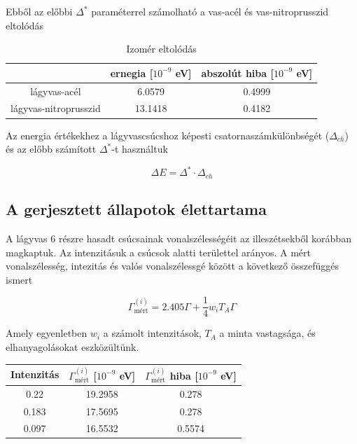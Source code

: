 \documentclass[a4paper,12pt]{article}
\begin{document}
\pagebreak

\par Ebből az előbbi $\Delta^{*}$ paraméterrel számolható a vas-acél és vas-nitroprusszid eltolódás

\begin{table}[!htb]
\begin{center}
\begin{tabular}{|c|c|c|}
\hline
 & ernegia [$10^{-9}$ eV] & abszolút hiba [$10^{-9}$ eV] \\
\hline
lágyvas-acél & 6.0579 & 0.4999 \\
\hline
lágyvas-nitroprusszid & 13.1418 & 0.4182 \\
\hline
\end{tabular}
\end{center}
\caption{Izomér eltolódás}
\end{table}

\par Az energia értékekhez a lágyvascsúcshoz képesti csatornaszámkülönbségét ($\Delta_{ch}$) és az előbb számított $\Delta^{*}$-t használtuk

\begin{equation*}
 \Delta E = \Delta^{*}\cdot \Delta_{ch}
\end{equation*}

\subsection{A gerjesztett állapotok élettartama}

\par A lágyvas 6 részre hasadt csúcsainak vonalszélességéit az illeszétsekből korábban magkaptuk. Az intenzitásuk a csúcsok alatti területtel arányos. A mért vonalszélesség, intezitás és valós vonalszélessgé között a következő összefüggés ismert

\begin{equation*}
	\Gamma_{\text{mért}}^{(i)} = 2.405\Gamma + \frac{1}{4}w_{i}T_{A}\Gamma
\end{equation*}

\par Amely egyenletben $w_{i}$ a számolt intenzitások, $T_{A}$ a minta vastagsága, és elhanyagolásokat eszközültünk.

\begin{center}
\begin{tabular}{|c|c|c|}
\hline
Intenzitás & $\Gamma_{\text{mért}}^{(i)}$ [$10^{-9}$ eV] & $\Gamma_{\text{mért}}^{(i)}$ hiba [$10^{-9}$ eV] \\
\hline
0.22 & 19.2958 & 0.278 \\
\hline
0.183 & 17.5695 & 0.278 \\
\hline
0.097 & 16.5532 & 0.5574\\
\hline
\end{tabular}
\end{center}
\end{document}
